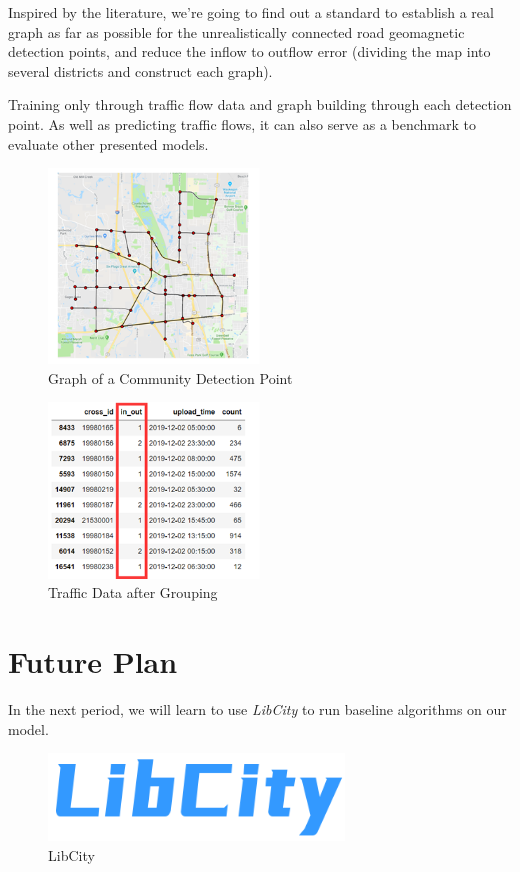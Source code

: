 \documentclass[fontset=none]{ctexart}
\theoremstyle{definition}
\theoremstyle{remark}
\begin{document}
Inspired by the literature, we're going to find out a standard to establish a real graph as far as possible for the unrealistically connected road geomagnetic detection points, and reduce the inflow to outflow error (dividing the map into several districts and construct each graph).

Training only through traffic flow data and graph building through each detection point. As well as predicting traffic flows, it can also serve as a benchmark to evaluate other presented models.

\begin{figure}[htb]
  \centering
  \includegraphics[width=0.5\textwidth]{images/8-3-5.png}
  \caption{Graph of a Community Detection Point}
  \label{fig: 835}
\end{figure}
\begin{figure}[htb]
  \centering
  \includegraphics[width=0.5\textwidth]{images/8-3-6.png}
  \caption{Traffic Data after Grouping}
  \label{fig: 836}
\end{figure}

\clearpage
\section{Future Plan}
In the next period, we will learn to use \textit{LibCity} to run baseline algorithms on our model.
\begin{figure}[htb]
  \centering
  \includegraphics[width=0.7\textwidth]{images/8-4-1.png}
  \caption{LibCity}
  \label{fig: 841}
\end{figure}
\end{document}
